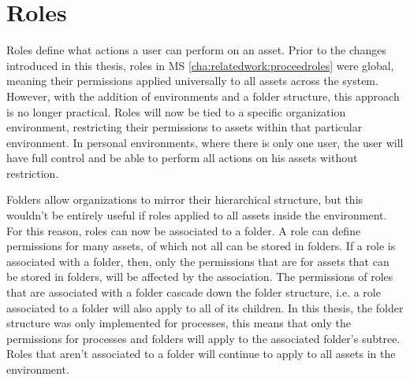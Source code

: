 \section{Roles}
\label{cha:conceptanddesign:roles}

Roles define what actions a user can perform on an asset. Prior to the changes introduced
in this thesis, roles in MS \ref{cha:relatedwork:proceedroles} were global,
meaning their permissions applied universally
to all assets across the system.
However, with the addition of environments and a folder structure, this approach is no longer practical.
Roles will now be tied to a specific organization environment,
restricting their permissions to assets within that particular environment.
In personal environments, where there is only one user, the user will have
full control and be able to perform all actions on his assets without restriction. 

Folders allow organizations to mirror their hierarchical structure, but this wouldn't be
entirely useful if roles applied to all assets inside the environment.
For this reason, roles can now be associated to a folder.
%
A role can define permissions for many assets, of which not all can be stored in folders.
If a role is associated with a folder, then, only the permissions that are for assets that
can be stored in folders, will be affected by the association.
%
The permissions of roles that are associated with a folder cascade down the
folder structure, i.e. a role associated to a folder will also apply to all of its children.
In this thesis, the folder structure was only implemented for processes,
this means that only the permissions for processes and folders will apply to the
associated folder's subtree.
Roles that aren't associated to a folder will continue to apply to all assets in the environment.

